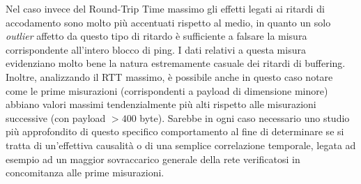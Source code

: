 \documentclass[a4paper,10pt]{article}
\begin{document}
\noindent
Nel caso invece del Round-Trip Time massimo gli effetti legati ai ritardi di accodamento sono molto più accentuati rispetto al medio, in quanto un solo \textit{outlier} affetto da questo tipo di ritardo è sufficiente a falsare la misura corrispondente all'intero blocco di ping. I dati relativi a questa misura evidenziano molto bene la natura estremamente casuale dei ritardi di buffering. Inoltre, analizzando il RTT massimo, è possibile anche in questo caso notare come le prime misurazioni (corrispondenti a payload di dimensione minore) abbiano valori massimi tendenzialmente più alti rispetto alle misurazioni successive (con payload $>400$ byte). Sarebbe in ogni caso necessario uno studio più approfondito di questo specifico comportamento al fine di determinare se si tratta di un'effettiva causalità o di una semplice correlazione temporale, legata ad esempio ad un maggior sovraccarico generale della rete verificatosi in concomitanza alle prime misurazioni.
\end{document}
